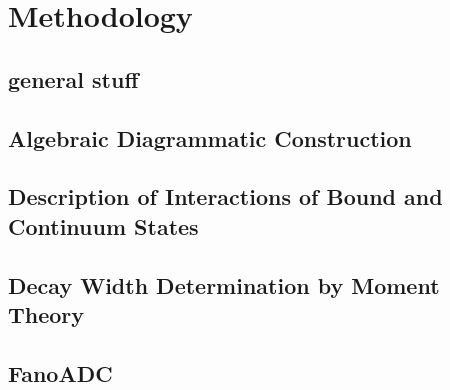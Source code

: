\chapter{Methodology}
\section{general stuff}
\section{Algebraic Diagrammatic Construction}
\section{Description of Interactions of Bound and Continuum States}
\section{Decay Width Determination by Moment Theory}
 
\section{FanoADC}
